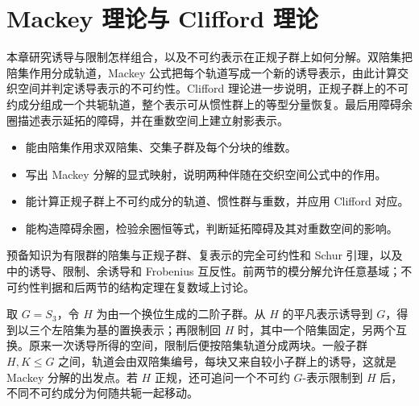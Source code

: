 

\chapter{Mackey 理论与 Clifford 理论}
\label{b5:ch:04}

\begin{chapterabstract}
	本章研究诱导与限制怎样组合，以及不可约表示在正规子群上如何分解。双陪集把陪集作用分成轨道，Mackey 公式把每个轨道写成一个新的诱导表示，由此计算交织空间并判定诱导表示的不可约性。Clifford 理论进一步说明，正规子群上的不可约成分组成一个共轭轨道，整个表示可从惯性群上的等型分量恢复。最后用障碍余圈描述表示延拓的障碍，并在重数空间上建立射影表示。
\end{chapterabstract}

\begin{learninggoals}
	\begin{itemize}
		\item 能由陪集作用求双陪集、交集子群及每个分块的维数。
		\item 写出 Mackey 分解的显式映射，说明两种伴随在交织空间公式中的作用。
		\item 能计算正规子群上不可约成分的轨道、惯性群与重数，并应用 Clifford 对应。
		\item 能构造障碍余圈，检验余圈恒等式，判断延拓障碍及其对重数空间的影响。
	\end{itemize}
	预备知识为有限群的陪集与正规子群、复表示的完全可约性和 Schur 引理，以及中的诱导、限制、余诱导和 Frobenius 互反性。前两节的模分解允许任意基域；不可约性判据和后两节的结构定理在复数域上讨论。
\end{learninggoals}

取 \(G=S_3\)，令 \(H\) 为由一个换位生成的二阶子群。从 \(H\) 的平凡表示诱导到 \(G\)，得到以三个左陪集为基的置换表示；再限制回 \(H\) 时，其中一个陪集固定，另两个互换。原来一次诱导所得的空间，限制后便按陪集轨道分成两块。一般子群 \(H,K\le G\) 之间，轨道会由双陪集编号，每块又来自较小子群上的诱导，这就是 Mackey 分解的出发点。若 \(H\) 正规，还可追问一个不可约 \(G\)-表示限制到 \(H\) 后，不同不可约成分为何随共轭一起移动。







